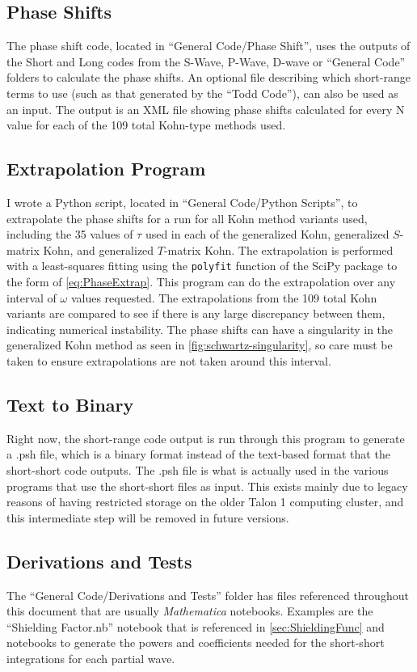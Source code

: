 \documentclass[Dissertation.tex]{subfiles}
\begin{document}
\subsection*{Phase Shifts}
The phase shift code, located in ``General Code/Phase Shift'', uses the
outputs of the Short and Long codes from the S-Wave, P-Wave, D-wave or
``General Code'' folders to calculate the phase shifts. An optional file
describing which short-range terms to use (such as that generated by the
``Todd Code''), can also be used as an input. The output is an XML file
showing phase shifts calculated for every N value for each of the 109
total Kohn-type methods used.

\subsection*{Extrapolation Program}
I wrote a Python \cite{Python} script, located in ``General Code/Python Scripts'', to extrapolate the phase shifts for a 
run for all Kohn method variants used, including the 35 values of $\tau$ used 
in each of the generalized Kohn, generalized $S$-matrix Kohn, and generalized
$T$-matrix Kohn. The extrapolation is performed with a least-squares fitting 
using the \texttt{polyfit} function of the SciPy package \cite{SciPy} to the 
form of \cref{eq:PhaseExtrap}. This program can do the extrapolation over any 
interval of $\omega$ values requested. The extrapolations from the 109 total 
Kohn variants are compared to see if there is any large discrepancy between 
them, indicating numerical instability. The phase shifts can have a 
singularity in the generalized Kohn method as seen in \cref{fig:schwartz-singularity}, so 
care must be taken to ensure extrapolations are not taken around this interval.

\subsection*{Text to Binary}
Right now, the short-range code output is run through this program to generate
a .psh file, which is a binary format instead of the text-based format that the
short-short code outputs. The .psh file is what is actually used in the
various programs that use the short-short files as input. This exists mainly due
to legacy reasons of having restricted storage on the older Talon 1 computing
cluster, and this intermediate step will be removed in future versions.

\subsection*{Derivations and Tests}
The ``General Code/Derivations and Tests'' folder has files referenced
throughout this document that are usually \emph{Mathematica} notebooks.
Examples are the ``Shielding Factor.nb'' notebook that is referenced in
\cref{sec:ShieldingFunc} and notebooks to generate the powers and coefficients
needed for the short-short integrations for each partial wave.
\end{document}
